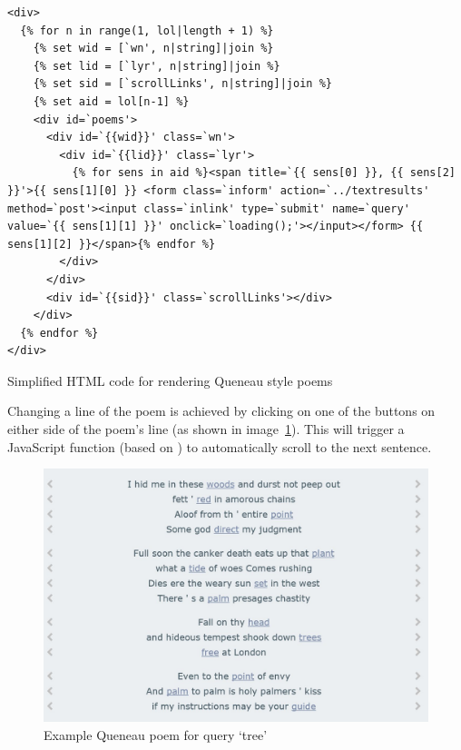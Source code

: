 \begin{listing}[!htbp] %
  \begin{verbatim}
<div>
  {% for n in range(1, lol|length + 1) %}
    {% set wid = [`wn', n|string]|join %}
    {% set lid = [`lyr', n|string]|join %}
    {% set sid = [`scrollLinks', n|string]|join %}
    {% set aid = lol[n-1] %}
    <div id=`poems'>
      <div id=`{{wid}}' class=`wn'>
        <div id=`{{lid}}' class=`lyr'>
          {% for sens in aid %}<span title=`{{ sens[0] }}, {{ sens[2] }}'>{{ sens[1][0] }} <form class=`inform' action=`../textresults' method=`post'><input class=`inlink' type=`submit' name=`query' value=`{{ sens[1][1] }}' onclick=`loading();'></input></form> {{ sens[1][2] }}</span>{% endfor %}
        </div>
      </div>
      <div id=`{{sid}}' class=`scrollLinks'></div>
    </div>
  {% endfor %}
</div>
  \end{verbatim}
\caption[HTML for Queneau style poems]{Simplified \ac{HTML} code for rendering Queneau style poems}
\label{code:qpoems}
\end{listing}

Changing a line of the poem is achieved by clicking on one of the buttons on either side of the poem's line (as shown in image~\ref{img:qpoemtree}). This will trigger a JavaScript function (based on \autocite{DYNWEB2016}) to automatically scroll to the next sentence. 

\begin{figure}[!htbp] %
  \centering
  \includegraphics[width=\linewidth]{images/qpoemtree}
\caption[Queneau poem for query `tree']{Example Queneau poem for query `tree'}
\label{img:qpoemtree}
\end{figure}

